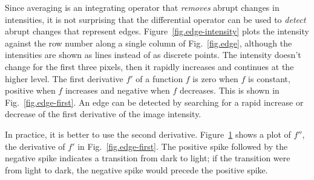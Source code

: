 \begin{figure}
\subfigures
\begin{minipage}{\textwidth}
\hspace{\fill}
\label{fig.edge-first}
\label{fig.edge-second}
\end{minipage}
\end{figure}

Since averaging is an integrating operator that \emph{removes} abrupt changes in intensities, it is not surprising that the differential operator can be used to \emph{detect} abrupt changes that represent edges. Figure~\ref{fig.edge-intensity} plots the intensity against the row number along a single column of Fig.~\ref{fig.edge}, although the intensities are shown as lines instead of as discrete points. The intensity doesn't change for the first three pixels, then it rapidly increases and continues at the higher level. The first derivative $f'$ of a function $f$ is zero when $f$ is constant, positive when $f$ increases and negative when $f$ decreases. This is shown in Fig.~\ref{fig.edge-first}. An edge can be detected by searching for a rapid increase or decrease of the first derivative of the image intensity.

In practice, it is better to use the second derivative. Figure~\ref{fig.edge-second} shows a plot of $f''$, the derivative of $f'$ in Fig.~\ref{fig.edge-first}. The positive spike followed by the negative spike indicates a transition from dark to light; if the transition were from light to dark, the negative spike would precede the positive spike.

